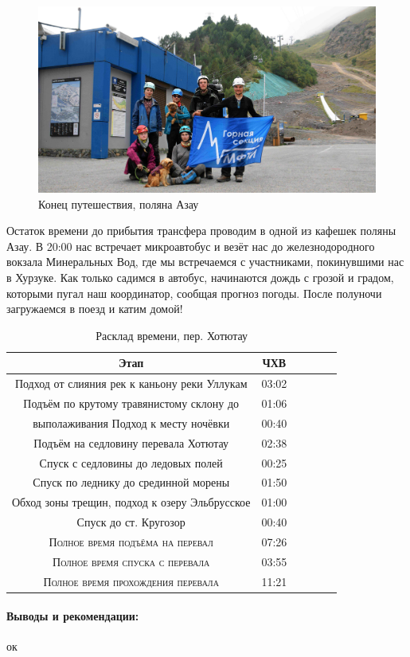 \begin{figure}[h!]
	\centering
	\includegraphics[width=0.7\linewidth]{../pics/group_finish.jpg}
	\caption{Конец путешествия, поляна Азау}
	\label{fig:group_finish}
\end{figure}

Остаток времени до прибытия трансфера проводим в одной из кафешек поляны Азау.
В 20:00 нас встречает микроавтобус и везёт нас до железнодородного вокзала Минеральных Вод, где мы встречаемся с участниками, покинувшими нас в Хурзуке. Как только садимся в автобус, начинаются дождь с грозой и градом, которыми пугал наш координатор, сообщая прогноз погоды. После полуночи загружаемся в поезд и катим домой!


\begin{table}[h!]
	\centering
	\begin{tabular}{|c|c|c|c|c|c|} 
		\hline 
		Этап & ЧХВ \\ 	
		\hline 
		Подход от слияния рек к каньону реки Уллукам		& 03:02\\
		Подъём по крутому травянистому склону до& 01:06 \\ выполаживания 
		Подход к месту ночёвки & 00:40 \\
		Подъём на седловину перевала Хотютау & 02:38\\
		Спуск с седловины до ледовых полей& 00:25\\
		Спуск по леднику до срединной морены & 01:50\\
		Обход зоны трещин, подход к озеру Эльбрусское& 01:00\\
		Спуск до ст. Кругозор & 00:40 \\
			
		\hline
		\textsc{Полное время подъёма на перевал  }& 07:26\\
		\textsc{Полное время спуска с перевала }& 03:55 \\
		\textsc{Полное время прохождения перевала }& 11:21 \\
		\hline
	\end{tabular}
	\caption{Расклад времени, пер. Хотютау}
\end{table}

\paragraph{Выводы и рекомендации:} ок


\clearpage